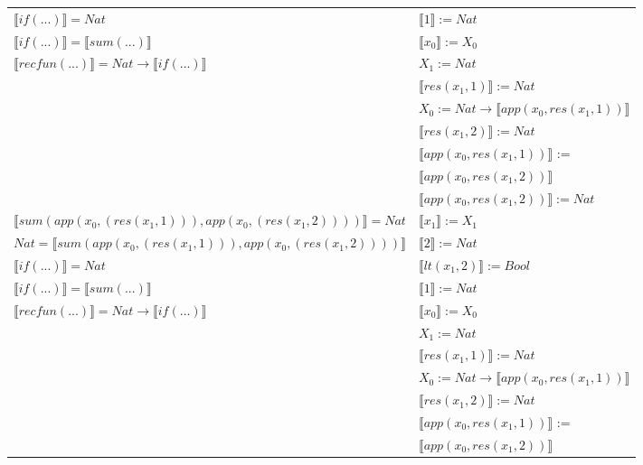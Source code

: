 \begin{exercise}
\begin{description}
\begin{center}
\begin{longtable}[!h]{ | l | l | }
                        $ \llbracket if(...) \rrbracket = Nat$ &   $ \llbracket 1 \rrbracket := Nat$\\ 
                        $ \llbracket if(...) \rrbracket =  \llbracket sum(...) \rrbracket$ & $ \llbracket x_0 \rrbracket := X_0$\\
                        $ \llbracket recfun(...) \rrbracket =   Nat  \to  \llbracket if(...) \rrbracket $ &  $X_1 := Nat$\\
                        &  $ \llbracket res(x_1,1) \rrbracket := Nat$ \\ 
                        & $X_0 := Nat \to  \llbracket app(x_0, res(x_1,1)) \rrbracket$\\
			     & $ \llbracket res(x_1,2) \rrbracket := Nat$ \\
			     & $ \llbracket app(x_0, res(x_1,1)) \rrbracket$ := \\
			     & $ \llbracket app(x_0, res(x_1,2)) \rrbracket$\\ 
			     & $ \llbracket app(x_0, res(x_1,2)) \rrbracket := Nat$ \\
                    \hline 
                        $ \llbracket sum(app(x_0, (res(x_1,1))), app(x_0, (res(x_1,2))))  \rrbracket = Nat$ & $ \llbracket x_1 \rrbracket := X_1$\\ 
                        $Nat =  \llbracket sum(app(x_0, (res(x_1,1))), app(x_0, (res(x_1,2)))) \rrbracket$ & $ \llbracket 2 \rrbracket := Nat$\\
                        $ \llbracket if(...) \rrbracket = Nat$ & $ \llbracket lt(x_1 , 2) \rrbracket := Bool$\\ 
                        $ \llbracket if(...) \rrbracket =  \llbracket sum(...) \rrbracket$ & $ \llbracket 1 \rrbracket := Nat$\\
                        $ \llbracket recfun(...) \rrbracket =   Nat  \to  \llbracket if(...) \rrbracket $ & $ \llbracket x_0 \rrbracket := X_0$\\
                        &  $X_1 := Nat$\\ 
                        & $ \llbracket res(x_1,1) \rrbracket := Nat$\\
			     &  $X_0 := Nat \to  \llbracket app(x_0, res(x_1,1)) \rrbracket$\\
			     & $ \llbracket res(x_1,2) \rrbracket := Nat$ \\
			     & $ \llbracket app(x_0, res(x_1,1)) \rrbracket$ := \\
			     & $ \llbracket app(x_0, res(x_1,2)) \rrbracket$\\ 

\end{longtable}
\end{center}
\end{description}
\end{exercise}
